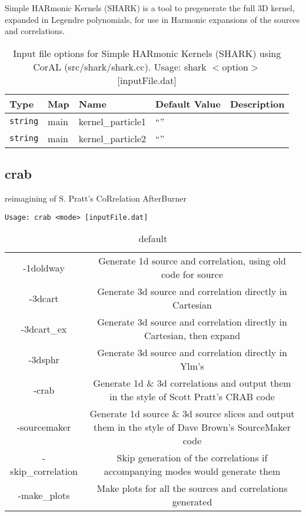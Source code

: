 \documentclass[10pt]{article}
\begin{document}
{Simple HARmonic Kernels (SHARK)  is a tool to pregenerate the full 3D kernel, expanded in Legendre polynomials, 
for use in Harmonic expansions of the sources and correlations.
        \begin{table}
            \begin{tabular}{lllll}
                \hline\hline
                Type & Map & Name & Default Value & Description \\
                \hline\hline 
                {\tt string} & main & kernel\_particle1 & ``'' & \\\hline
                {\tt string} & main & kernel\_particle2 & ``'' & \\\hline
            \end{tabular}
            \caption{Input file options for Simple HARmonic Kernels (SHARK) using CorAL (src/shark/shark.cc). Usage: shark $<$option$>$ [inputFile.dat]}
            \label{sharkCLOptions}
        \end{table}


\subsection{crab}
reimagining of S. Pratt's CoRrelation AfterBurner

{\tt Usage: crab <mode> [inputFile.dat]}
\begin{table}[htdp]
\caption{default}
\begin{center}
\begin{tabular}{|c|c|}
	-1doldway		& Generate 1d source and correlation, using old code for source\\
	-3dcart       	& Generate 3d source and correlation directly in Cartesian\\
	-3dcart\_ex    	& Generate 3d source and correlation directly in Cartesian, then expand\\
	-3dsphr       	& Generate 3d source and correlation directly in Ylm's\\
	-crab        	 	&  Generate 1d \& 3d correlations and output them in the style of Scott Pratt's CRAB code\\
	-sourcemaker  	& Generate 1d source \& 3d source slices and output them in the style of Dave Brown's SourceMaker code\\
	-skip\_correlation  & Skip generation of the correlations if accompanying modes would generate them\\
	-make\_plots   & Make plots for all the sources and correlations generated\\
\end{tabular}
\end{center}
\label{crabCLOptions}
\end{table}

}
\end{document}
